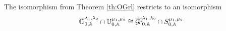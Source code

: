 \documentclass[draft]{article}
\begin{document}
\begin{theorem}
    The isomorphism from Theorem \ref{th:OGrl} restricts to an isomorphism
    $$ \overline{\mathbb O}^{\lambda_1, \lambda_2}_{0,\mathbb A} \cap \mathbb U^{\mu_1, \mu_2}_{0,\mathbb A} \cong \overline{\mathcal{G}\!r}^{\lambda_1, \lambda_2}_{0,\mathbb A} \cap S^{\mu_1, \mu_2}_{0,\mathbb A}$$
\end{theorem}

% 
% 
% 
\end{document}
